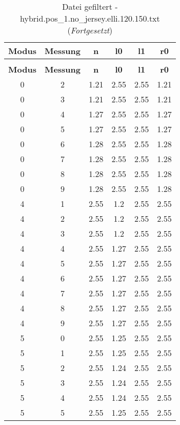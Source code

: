 \begin{longtable}{|c|c||c||c|c||c|}
	\caption{Datei gefiltert - hybrid.pos\_1.no\_jersey.elli.120.150.txt} \label{tab:hybrid.pos-1.no-jersey.elli.120.150.txt} \\ \hline
	\textbf{Modus} & \textbf{Messung} & \textbf{n} & \textbf{l0} & \textbf{l1} & \textbf{r0}\\ \hline
	\endfirsthead
	\caption[]{Datei gefiltert - hybrid.pos\_1.no\_jersey.elli.120.150.txt (\emph{Fortgesetzt})} \\ \hline
	\textbf{Modus} & \textbf{Messung} & \textbf{n} & \textbf{l0} & \textbf{l1} & \textbf{r0}\\ \hline
	\endhead
	0 & 2 & 1.21 & 2.55 & 2.55 & 1.21 \\ \hline
	0 & 3 & 1.21 & 2.55 & 2.55 & 1.21 \\ \hline
	0 & 4 & 1.27 & 2.55 & 2.55 & 1.27 \\ \hline
	0 & 5 & 1.27 & 2.55 & 2.55 & 1.27 \\ \hline
	0 & 6 & 1.28 & 2.55 & 2.55 & 1.28 \\ \hline
	0 & 7 & 1.28 & 2.55 & 2.55 & 1.28 \\ \hline
	0 & 8 & 1.28 & 2.55 & 2.55 & 1.28 \\ \hline
	0 & 9 & 1.28 & 2.55 & 2.55 & 1.28 \\ \hline
	4 & 1 & 2.55 & 1.2 & 2.55 & 2.55 \\ \hline
	4 & 2 & 2.55 & 1.2 & 2.55 & 2.55 \\ \hline
	4 & 3 & 2.55 & 1.2 & 2.55 & 2.55 \\ \hline
	4 & 4 & 2.55 & 1.27 & 2.55 & 2.55 \\ \hline
	4 & 5 & 2.55 & 1.27 & 2.55 & 2.55 \\ \hline
	4 & 6 & 2.55 & 1.27 & 2.55 & 2.55 \\ \hline
	4 & 7 & 2.55 & 1.27 & 2.55 & 2.55 \\ \hline
	4 & 8 & 2.55 & 1.27 & 2.55 & 2.55 \\ \hline
	4 & 9 & 2.55 & 1.27 & 2.55 & 2.55 \\ \hline
	5 & 0 & 2.55 & 1.25 & 2.55 & 2.55 \\ \hline
	5 & 1 & 2.55 & 1.25 & 2.55 & 2.55 \\ \hline
	5 & 2 & 2.55 & 1.24 & 2.55 & 2.55 \\ \hline
	5 & 3 & 2.55 & 1.24 & 2.55 & 2.55 \\ \hline
	5 & 4 & 2.55 & 1.24 & 2.55 & 2.55 \\ \hline
	5 & 5 & 2.55 & 1.25 & 2.55 & 2.55 \\ \hline

\end{longtable}
